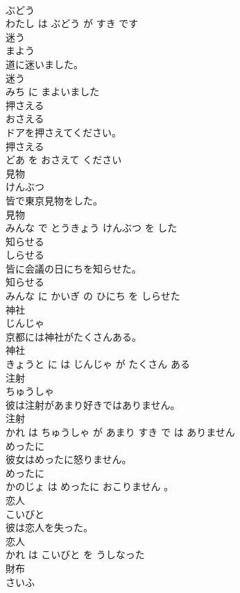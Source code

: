 \documentclass[8pt]{extreport}
\begin{document}
\begin{CJK}{UTF8}{min}
\\	ぶどう 
\\	わたし は ぶどう が すき です			
\\	迷う	
\\	まよう			
\\	道に迷いました。	
\\	迷う 
\\	みち に まよいました			
\\	押さえる	
\\	おさえる			
\\	ドアを押さえてください。	
\\	押さえる 
\\	どあ を おさえて ください			
\\	見物	
\\	けんぶつ			
\\	皆で東京見物をした。	
\\	見物 
\\	みんな で とうきょう けんぶつ を した			
\\	知らせる	
\\	しらせる			
\\	皆に会議の日にちを知らせた。	
\\	知らせる 
\\	みんな に かいぎ の ひにち を しらせた			
\\	神社	
\\	じんじゃ			
\\	京都には神社がたくさんある。	
\\	神社 
\\	きょうと に は じんじゃ が たくさん ある			
\\	注射	
\\	ちゅうしゃ			
\\	彼は注射があまり好きではありません。	
\\	注射 
\\	かれ は ちゅうしゃ が あまり すき で は ありません			
\\	めったに	
\\	彼女はめったに怒りません。	
\\	めったに 
\\	かのじょ は めったに おこりません 。			
\\	恋人	
\\	こいびと			
\\	彼は恋人を失った。	
\\	恋人 
\\	かれ は こいびと を うしなった			
\\	財布	
\\	さいふ			

\end{CJK}
\end{document}
